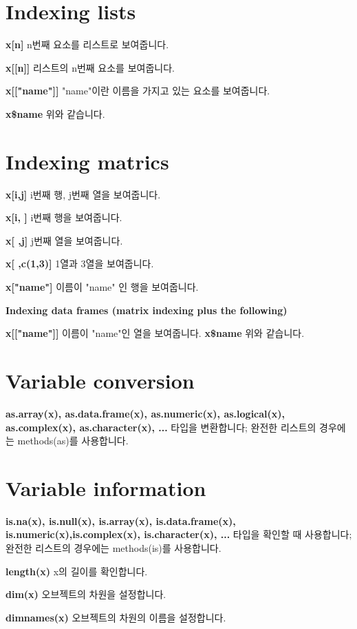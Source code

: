\documentclass[landscape,twocolumn,letterpaper]{article}
\begin{document}
\section{Indexing lists}

\textbf{x[n]} n번째 요소를 리스트로 보여줍니다.

\textbf{x[[n]]} 리스트의 n번째 요소를 보여줍니다.

\textbf{x[["name"]]} "name"이란 이름을 가지고 있는 요소를 보여줍니다.

\textbf{x\$name} 위와 같습니다.

\section{Indexing matrics}
\textbf{x[i,j]} i번째 행, j번째 열을 보여줍니다.

\textbf{x[i, ]} i번째 행을 보여줍니다.

\textbf{x[ ,j]} j번째 열을 보여줍니다.

\textbf{x[ ,c(1,3)]} 1열과 3열을 보여줍니다.

\textbf{x["name"]} 이름이 "name" 인 행을 보여줍니다.

\textbf{Indexing data frames (matrix indexing plus the following)}

\textbf{x[["name"]]} 이름이 "name"인 열을 보여줍니다.
\textbf{x\$name} 위와 같습니다.



\section{Variable conversion}

\textbf{as.array(x), as.data.frame(x), as.numeric(x), as.logical(x),
as.complex(x), as.character(x), ...}
타입을 변환합니다; 완전한 리스트의 경우에는 methods(as)를 사용합니다.

\section{Variable information}

\textbf{is.na(x), is.null(x), is.array(x), is.data.frame(x),
is.numeric(x),is.complex(x), is.character(x), ...}
타입을 확인할 때 사용합니다; 완전한 리스트의 경우에는 methods(is)를 사용합니다.

\textbf{length(x)} x의 길이를 확인합니다.

\textbf{dim(x)} 오브젝트의 차원을 설정합니다.

\textbf{dimnames(x)} 오브젝트의 차원의 이름을 설정합니다.
\end{document}
